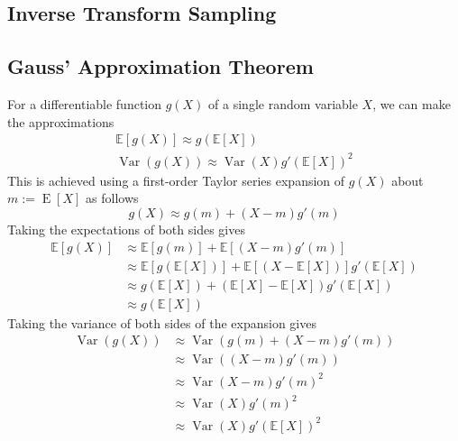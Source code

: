 \documentclass[11pt]{report} %
\begin{document}
\subsection{Inverse Transform Sampling}

\subsection{Gauss' Approximation Theorem \cite{Blom1989}}

For a differentiable function $g\left(X\right)$ of a single random variable $X$, we can make the approximations
\begin{gather}
\mathbb{E}\left[g\left(X\right)\right] \approx g\left(\mathbb{E}\left[X\right]\right) \\
\operatorname{Var}\left(g\left(X\right)\right) \approx \operatorname{Var}\left(X\right)g'\left(\mathbb{E}\left[X\right]\right)^{2}
\end{gather}
This is achieved using a first-order Taylor series expansion of $g\left(X\right)$ about $m := \operatorname{E}\left[X\right]$ as follows
\begin{equation}
g\left(X\right) \approx g\left(m\right) + \left(X - m\right)g'\left(m\right)
\end{equation}
Taking the expectations of both sides gives
\begin{align}
\mathbb{E}\left[g\left(X\right)\right] &\approx \mathbb{E}\left[g\left(m\right)\right] + \mathbb{E}\left[\left(X - m\right)g'\left(m\right)\right] \\
&\approx \mathbb{E}\left[g\left(\mathbb{E}\left[X\right]\right)\right] + \mathbb{E}\left[\left(X - \mathbb{E}\left[X\right]\right)\right]g'\left(\mathbb{E}\left[X\right]\right) \\
&\approx g\left(\mathbb{E}\left[X\right]\right) + \left(\mathbb{E}\left[X\right] - \mathbb{E}\left[X\right]\right)g'\left(\mathbb{E}\left[X\right]\right) \\
&\approx g\left(\mathbb{E}\left[X\right]\right)
\end{align}
Taking the variance of both sides of the expansion gives
\begin{align}
\operatorname{Var}\left(g\left(X\right)\right) &\approx \operatorname{Var}\left(g\left(m\right) + \left(X - m\right)g'\left(m\right)\right) \\
&\approx \operatorname{Var}\left(\left(X - m\right)g'\left(m\right)\right) \\
&\approx \operatorname{Var}\left(X - m\right)g'\left(m\right)^{2} \\
&\approx \operatorname{Var}\left(X\right)g'\left(m\right)^{2} \\
&\approx \operatorname{Var}\left(X\right)g'\left(\mathbb{E}\left[X\right]\right)^{2} 
\end{align}
\end{document}
